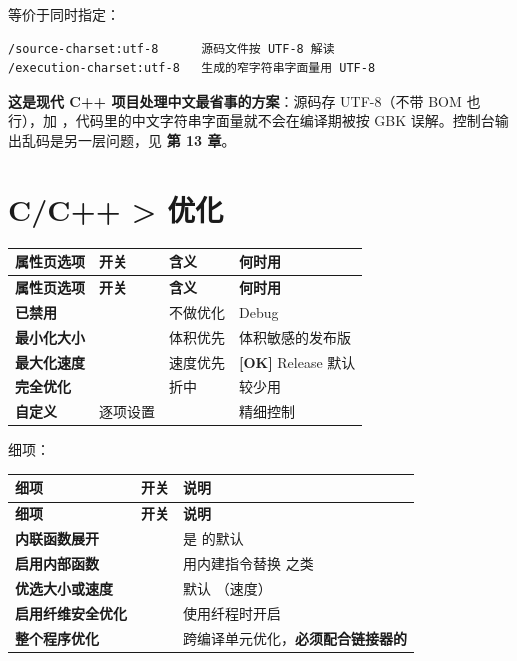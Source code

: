  等价于同时指定：

\begin{lstlisting}[style=textstyle, breaklines=true]
/source-charset:utf-8      源码文件按 UTF-8 解读
/execution-charset:utf-8   生成的窄字符串字面量用 UTF-8
\end{lstlisting}

\textbf{这是现代 C++ 项目处理中文最省事的方案}：源码存 UTF-8（不带 BOM 也行），加 ，代码里的中文字符串字面量就不会在编译期被按 GBK 误解。控制台输出乱码是另一层问题，见 \textbf{第 13 章}。

\section{C/C++ > 优化}

\begin{longtable}{L{3.2cm}L{2.2cm}L{5.0cm}L{3.8cm}}
\toprule
\textbf{属性页选项} & \textbf{开关} & \textbf{含义} & \textbf{何时用} \\
\midrule
\endfirsthead
\toprule
\textbf{属性页选项} & \textbf{开关} & \textbf{含义} & \textbf{何时用} \\
\midrule
\endhead
\bottomrule
\endlastfoot
\textbf{已禁用} &  & 不做优化 & Debug \\
\textbf{最小化大小} &  & 体积优先 & 体积敏感的发布版 \\
\textbf{最大化速度} &  & 速度优先 & \textbf{[OK]} Release 默认 \\
\textbf{完全优化} &  & 折中 & 较少用 \\
\textbf{自定义} & 逐项设置 & & 精细控制 \\
\end{longtable}

细项：

\begin{longtable}{L{4.6cm}L{4.2cm}L{5.6cm}}
\toprule
\textbf{细项} & \textbf{开关} & \textbf{说明} \\
\midrule
\endfirsthead
\toprule
\textbf{细项} & \textbf{开关} & \textbf{说明} \\
\midrule
\endhead
\bottomrule
\endlastfoot
\textbf{内联函数展开} &    &  是  的默认 \\
\textbf{启用内部函数} &  & 用内建指令替换  之类 \\
\textbf{优选大小或速度} &   & 默认 （速度） \\
\textbf{启用纤维安全优化} &  & 使用纤程时开启 \\
\textbf{整个程序优化} &  & 跨编译单元优化，\textbf{必须配合链接器的 } \\
\end{longtable}

